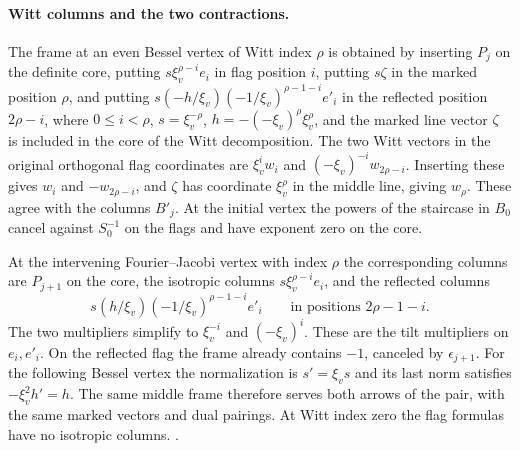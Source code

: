 \paragraph{Witt columns and the two contractions.}
The frame at an even Bessel vertex of Witt index \(\rho\) is
obtained by inserting \(P_j\) on the definite core, putting
\(s\xi_v^{\rho-i}e_i\) in flag position \(i\), putting \(s\zeta\)
in the marked position \(\rho\), and putting
\(s(-h/\xi_v)(-1/\xi_v)^{\rho-1-i}e'_i\) in the reflected
position \(2\rho-i\), where \(0\le i<\rho\),
\(s=\xi_v^{-\rho}\),
\(h=-(-\xi_v)^\rho\xi_v^\rho\), and the marked line vector
\(\zeta\) is included in the core of the Witt decomposition.
The two Witt vectors in the original orthogonal flag coordinates
are \(\xi_v^i w_i\) and \((-\xi_v)^{-i}w_{2\rho-i}\). Inserting
these gives \(w_i\) and \(-w_{2\rho-i}\), and \(\zeta\) has
coordinate \(\xi_v^\rho\) in the middle line, giving \(w_\rho\).
These agree with the columns \(B'_j\). At the initial vertex the
powers of the staircase in \(B_0\) cancel against \(S_0^{-1}\)
on the flags and have exponent zero on the core.

At the intervening Fourier--Jacobi vertex with index \(\rho\)
the corresponding columns are \(P_{j+1}\) on the core, the
isotropic columns \(s\xi_v^{\rho-i}e_i\), and the reflected
columns
\[
 s(h/\xi_v)(-1/\xi_v)^{\rho-1-i}e'_i
 \qquad\text{in positions }2\rho-1-i.
\]
The two multipliers simplify to
\(\xi_v^{-i}\) and \((-\xi_v)^i\). These are the tilt
multipliers on \(e_i,e'_i\). On the reflected flag the frame
already contains \(-1\), canceled by \(\epsilon_{j+1}\).
For the following Bessel vertex the normalization is
\(s'=\xi_v s\) and its last norm satisfies \(-\xi_v^2h'=h\).
The same middle frame therefore serves both arrows of the
pair, with the same marked vectors and dual pairings. At
Witt index zero the flag formulas have no isotropic columns.
.


